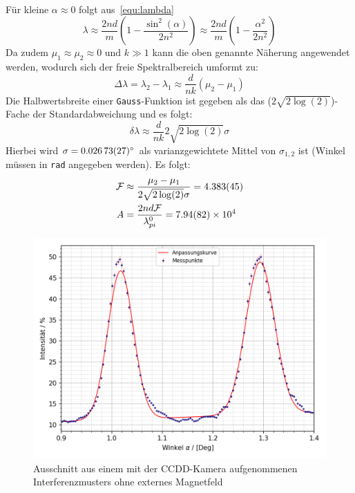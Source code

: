 \begin{itemize}
\begin{align*}
    \end{align*}
    Für kleine $\alpha\approx 0$ folgt aus~\cref{equ:lambda}
    \begin{equation*}
        \lambda \approx \frac{2nd}{m}\left( 1- \frac{\sin^2(\alpha)}{2n^2} \right)
            \approx \frac{2nd}{m}\left( 1-\frac{\alpha^2}{2n^2} \right)
    \end{equation*}
    Da zudem $\mu_1\approx\mu_2\approx 0$ und $k\gg1$ kann die oben genannte Näherung angewendet werden, wodurch sich der freie Spektralbereich umformt zu:
    \begin{equation*}
        \Delta\lambda = \lambda_2-\lambda_1\approx\frac{d}{nk}(\mu_2-\mu_1)
    \end{equation*} 
    Die Halbwertsbreite einer \texttt{Gauss}-Funktion ist gegeben als das ($2\sqrt{2\log(2)}$)-Fache der Standardabweichung und es folgt:
    \begin{equation*}
        \delta\lambda\approx \frac{d}{nk}2\sqrt{2\log(2)}\sigma
    \end{equation*}
    Hierbei wird $\sigma = \SI{0.02673 \pm 0.00027}{\degree}$ als varianzgewichtete Mittel von $\sigma_{1,2}$ ist (Winkel müssen in \texttt{rad} angegeben werden). Es folgt:
    \begin{align*}
        \mathcal{F} &\approx \frac{\mu_2-\mu_1}{2\sqrt{2\log(2)}\sigma} = \SI{4.383\pm 0.045}{}\\
        A &= \frac{2nd\mathcal{F}}{\lambda_{pi}^0} = \SI{7.94(82)e4}{}
    \end{align*}
\end{itemize}

\begin{figure}[ht]
    \centering
    \includegraphics[width=.7\linewidth]{plots/finesse.png}
    \caption{Ausschnitt aus einem mit der CCDD-Kamera aufgenommenen Interferenzmusters ohne externes Magnetfeld}\label{fig:finesse}   
\end{figure}

